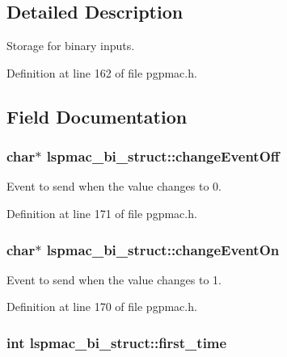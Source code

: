 \subsection{Detailed Description}
Storage for binary inputs. 

Definition at line 162 of file pgpmac.\-h.



\subsection{Field Documentation}
\hypertarget{structlspmac__bi__struct_ae0859842f637694ace0e6d54c0e2af6a}{
\subsubsection[{change\-Event\-Off}]{\setlength{\rightskip}{0pt plus 5cm}char$\ast$ lspmac\-\_\-bi\-\_\-struct\-::change\-Event\-Off}}\label{structlspmac__bi__struct_ae0859842f637694ace0e6d54c0e2af6a}


Event to send when the value changes to 0. 



Definition at line 171 of file pgpmac.\-h.

\hypertarget{structlspmac__bi__struct_ae7178007dfdf21be0e5b1fbaa36732af}{
\subsubsection[{change\-Event\-On}]{\setlength{\rightskip}{0pt plus 5cm}char$\ast$ lspmac\-\_\-bi\-\_\-struct\-::change\-Event\-On}}\label{structlspmac__bi__struct_ae7178007dfdf21be0e5b1fbaa36732af}


Event to send when the value changes to 1. 



Definition at line 170 of file pgpmac.\-h.

\hypertarget{structlspmac__bi__struct_a814978c33dc99e7911faa4ddb12bfd90}{
\subsubsection[{first\-\_\-time}]{\setlength{\rightskip}{0pt plus 5cm}int lspmac\-\_\-bi\-\_\-struct\-::first\-\_\-time}}\label{structlspmac__bi__struct_a814978c33dc99e7911faa4ddb12bfd90}



